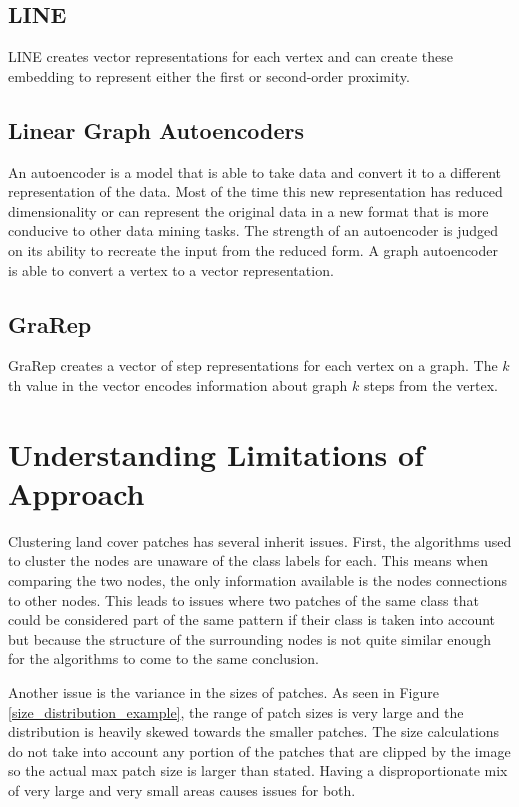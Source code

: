 \documentclass[conference]{IEEEtran}
\begin{document}
	\subsection{LINE \cite{Tang2015LINELI}}
	LINE creates vector representations for each vertex and can create these embedding to represent either the first or second-order proximity. 
	
	\subsection{Linear Graph Autoencoders \cite{SalhaGalvan2019KeepIS}}
	An autoencoder is a model that is able to take data and convert it to a different representation of the data. Most of the time this new representation has reduced dimensionality or can represent the original data in a new format that is more conducive to other data mining tasks. The strength of an autoencoder is judged on its ability to recreate the input from the reduced form. A graph autoencoder is able to convert a vertex to a vector representation.
	
	\subsection{GraRep \cite{Cao2015GraRepLG}}
	GraRep creates a vector of step representations for each vertex on a graph. The ${k}$th value in the vector encodes information about graph ${k}$ steps from the vertex.
	
	\section{Understanding Limitations of Approach}
	Clustering land cover patches has several inherit issues. First, the algorithms used to cluster the nodes are unaware of the class labels for each. This means when comparing the two nodes, the only information available is the nodes connections to other nodes. This leads to issues where two patches of the same class that could be considered part of the same pattern if their class is taken into account but because the structure of the surrounding nodes is not quite similar enough for the algorithms to come to the same conclusion.
	
	
	Another issue is the variance in the sizes of patches. As seen in Figure \ref{size_distribution_example}, the range of patch sizes is very large and the distribution is heavily skewed towards the smaller patches. The size calculations do not take into account any portion of the patches that are clipped by the image so the actual max patch size is larger than stated. Having a disproportionate mix of very large and very small areas causes issues for both.
	
\end{document}
